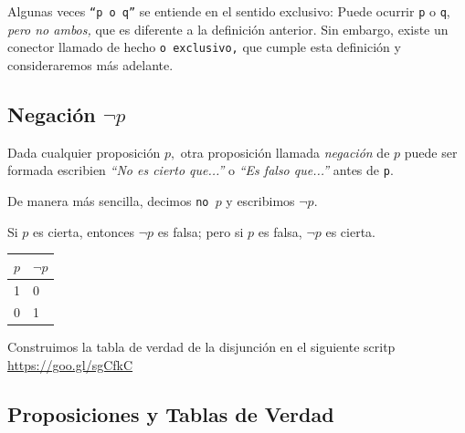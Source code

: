  \begin{rem}
  Algunas veces \texttt{``p o q''} se entiende en el sentido exclusivo: Puede ocurrir \texttt{p} o \texttt{q}, \emph{pero no ambos,} que es diferente a la definici\'on anterior. Sin embargo, existe un conector llamado de hecho \texttt{o exclusivo,} que cumple esta definici\'on y consideraremos m\'as adelante. 
 \end{rem}



\subsection{Negaci\'on $\neg p$}


 Dada cualquier proposici\'on $p,$ otra proposici\'on llamada \emph{negaci\'on} de $p$ puede ser formada escribien \emph{``No es cierto que...''} o \emph{``Es falso que...''} antes de \texttt{p}.
 
 De manera m\'as sencilla, decimos \texttt{no $p$} y escribimos $\neg p.$



 
\begin{defn}[Negaci\'on]
 Si $p$ es cierta, entonces $\neg p$ es falsa; pero si $p$ es falsa, $\neg p$ es cierta.
\end{defn}




    \begin{tdv}[Negaci\'on] \hfill
        \label{tdv:not}
        \begin{center}
            \begin{tabular}{|l|l|}\hline
                $p$ & $\neg p$\\\hline
                1 & 0 \\\hline
                0 & 1 \\\hline
            \end{tabular}
        \end{center}
        
    \end{tdv}
    
    Construimos la tabla de verdad de la disjunci\'on en el siguiente scritp \href{https://cloud.sagemath.com/projects/12787063-cafe-4f3b-a2e0-905f8b83cf3b/files/MD01_TDV03_NOT.sagews}{https://goo.gl/sgCfkC}
   

\subsection{Proposiciones y Tablas de Verdad}

